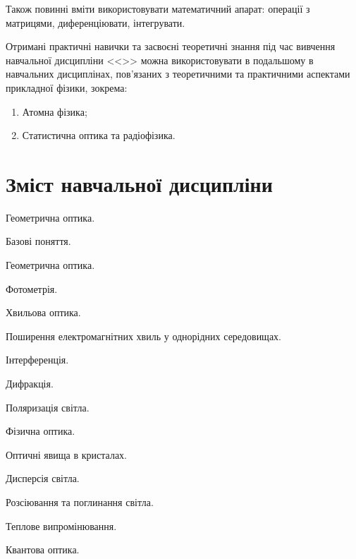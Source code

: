 \documentclass{Syllabus}
\begin{document}
Також повинні вміти використовувати математичний апарат: операції з матрицями,  диференціювати, інтегрувати.

Отримані практичні навички та засвоєні теоретичні знання під час вивчення навчальної дисципліни <<\discipline>> можна використовувати в подальшому в навчальних дисциплінах, пов’язаних з теоретичними та практичними аспектами прикладної фізики, зокрема:

\begin{enumerate}
    \item Атомна фізика;
    \item Статистична оптика та радіофізика.
\end{enumerate}


\section{Зміст навчальної дисципліни}


\begin{Rozdil}
    \item Геометрична оптика.
    \begin{Rozdil}
        \item Базові поняття.
        \item Геометрична оптика.
        \item Фотометрія.
    \end{Rozdil}
    \item Хвильова оптика.
    \begin{Rozdil}
        \item Поширення електромагнітних хвиль у однорідних середовищах.
        \item Інтерференція.
        \item Дифракція.
        \item Поляризація світла.
    \end{Rozdil}
    \item Фізична оптика.
    \begin{Rozdil}
        \item Оптичні явища в кристалах.
        \item Дисперсія світла.
        \item Розсіювання та поглинання світла.
        \item Теплове випромінювання.
        \item Квантова оптика.
    \end{Rozdil}
\end{Rozdil}
\end{document}
